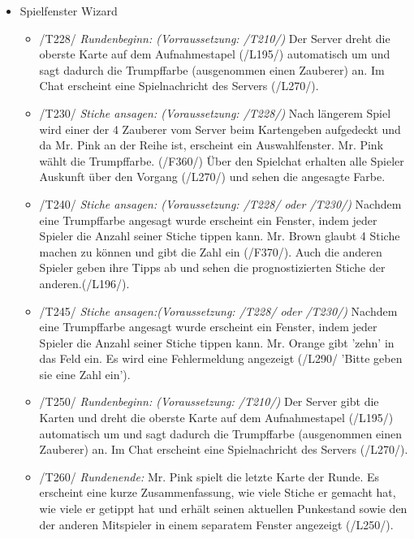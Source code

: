 \documentclass{article}
\begin{document}
\begin{itemize}
	\item Spielfenster Wizard
	
	\begin{itemize}
	
		\item /T228/ \textit{Rundenbeginn: (Vorraussetzung: /T210/)} Der Server dreht die oberste Karte auf dem Aufnahmestapel (/L195/) automatisch um und sagt dadurch die Trumpffarbe (ausgenommen einen Zauberer) an. Im Chat erscheint eine Spielnachricht des Servers (/L270/).

		\item /T230/ \textit{Stiche ansagen: (Voraussetzung: /T228/)} Nach längerem Spiel wird einer der 4 Zauberer vom Server beim Kartengeben aufgedeckt und da Mr. Pink an der Reihe ist, erscheint ein Auswahlfenster. Mr. Pink wählt die Trumpffarbe. (/F360/) Über den Spielchat erhalten alle Spieler Auskunft über den Vorgang (/L270/) und sehen die angesagte Farbe.
	
		\item /T240/ \textit{Stiche ansagen: (Voraussetzung: /T228/ oder /T230/)} Nachdem eine Trumpffarbe angesagt wurde erscheint ein Fenster, indem jeder Spieler die Anzahl seiner Stiche tippen kann. Mr. Brown glaubt 4 Stiche machen zu können und gibt die Zahl ein (/F370/). Auch die anderen Spieler geben ihre Tipps ab und sehen die prognostizierten Stiche der anderen.(/L196/).
		
		\item /T245/ \textit{Stiche ansagen:(Voraussetzung: /T228/ oder /T230/)} Nachdem eine Trumpffarbe angesagt wurde erscheint ein Fenster, indem jeder Spieler die Anzahl seiner Stiche tippen kann. Mr. Orange gibt 'zehn' in das Feld ein. Es wird eine Fehlermeldung angezeigt (/L290/ 'Bitte geben sie eine Zahl ein').

		\item /T250/ \textit{Rundenbeginn: (Voraussetzung: /T210/)} Der Server gibt die Karten und dreht die oberste Karte auf dem Aufnahmestapel (/L195/) automatisch um und sagt dadurch die Trumpffarbe (ausgenommen einen Zauberer) an. Im Chat erscheint eine Spielnachricht des Servers (/L270/).
		
				\item /T260/ \textit{Rundenende:} Mr. Pink spielt die letzte Karte der Runde. Es erscheint eine kurze Zusammenfassung, wie viele Stiche er gemacht hat, wie viele er getippt hat und erhält seinen aktuellen Punkestand sowie den der anderen Mitspieler in einem separatem Fenster angezeigt (/L250/).
					

\end{itemize}
\end{itemize}
\end{document}
